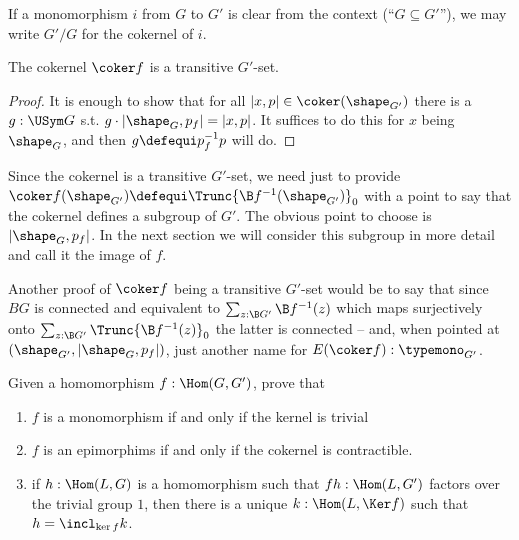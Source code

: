 If a monomorphism $i$ from $G$ to $G'$ is clear from the context (``$G\subseteq G'$''), we may write $G'/G$ for the cokernel of $i$.
\begin{lemma}
  \label{lem:coker is transitive}
  The cokernel $\coker f$ is a transitive $G'$-set.
\end{lemma}
\begin{proof}
  It is enough to show that for all $|x,p|\in\coker(\shape_{G'})$ there is a $g:\USym G$ s.t. $g\cdot |\shape_G,p_f|= |x,p|$.  It suffices to do this for $x$ being $\shape_G$, and then $g\defequi p_f^{-1}p$ will do.
\end{proof}
\begin{remark}
  \label{remark:imageandcokernel}
  Since the cokernel is a transitive $G'$-set, we need just to provide $\coker f(\shape_{G'})\defequi\Trunc{\B f^{-1}(\shape_{G'})}_0$ with a point to say that the cokernel defines a subgroup of $G'$. The obvious point to choose is $|\shape_G,p_f|$. In the next section we will consider this subgroup in more detail and call it the image of $f$.

Another proof of $\coker f$ being a transitive $G'$-set would be to say that since $BG$ is connected and equivalent to $\sum_{z:\B G'}\B f^{-1}(z)$ which maps surjectively onto $\sum_{z:\B G'}\Trunc{\B f^{-1}(z)}_0$ the latter is connected -- and, when pointed at $(\shape_{G'},|\shape_G,p_f|)$, just another name for $E(\coker f):\typemono_{G'}$.
\end{remark}


\begin{xca}
  Given a homomorphism $f:\Hom(G,G')$, prove that
  \begin{enumerate}
  \item $f$ is a monomorphism if and only if the kernel is trivial
  \item $f$ is an epimorphims if and only if the cokernel is contractible.
  \item if $h:\Hom(L,G)$ is a homomorphism such that $fh:\Hom(L,G')$ factors over the trivial group $1$, then there is a unique $k:\Hom(L,\Ker f)$ such that $h=\incl_{\ker f}k$.
  \end{enumerate}
\end{xca}


